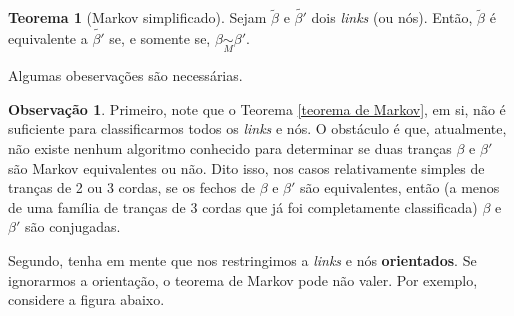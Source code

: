 \documentclass[a4paper,portuguese,11pt,twoside, leqno]{book}
\theoremstyle{definition}
\newtheorem{theorem}{Teorema}[section]
\newtheorem{remark}{Observação}[section]
\begin{document}
	\begin{theorem}[Markov simplificado]
		\label{teorema de Markov simplificado}
		Sejam $\widetilde{\beta}$ e $\widetilde{\beta'}$ dois \textit{links} (ou nós). Então, $\widetilde{\beta}$ é equivalente a $\widetilde{\beta'}$ se, e somente se, $\beta\underset{M}{\sim}\beta'$.
	\end{theorem}
	\par\vspace{0.3cm} Algumas obeservações são necessárias.
	\begin{remark}
		Primeiro, note que o Teorema \eqref{teorema de Markov}, em si, não é suficiente para classificarmos todos os \textit{links} e nós. O obstáculo é que, atualmente, não existe nenhum algoritmo conhecido para determinar se duas tranças $\beta$ e $\beta'$ são Markov equivalentes ou não. Dito isso, nos casos relativamente simples de tranças de 2 ou 3 cordas, se os fechos de $\beta$ e $\beta'$ são equivalentes, então (a menos de uma família de tranças de 3 cordas que já foi completamente classificada) $\beta$ e $\beta'$ são conjugadas.\cite{classificacao}
		\par\vspace{0.3cm} Segundo, tenha em mente que nos restringimos a \textit{links} e nós \textbf{orientados}. Se ignorarmos a orientação, o teorema de Markov pode não valer. Por exemplo, considere a figura abaixo.
		

\end{remark}
\end{document}
